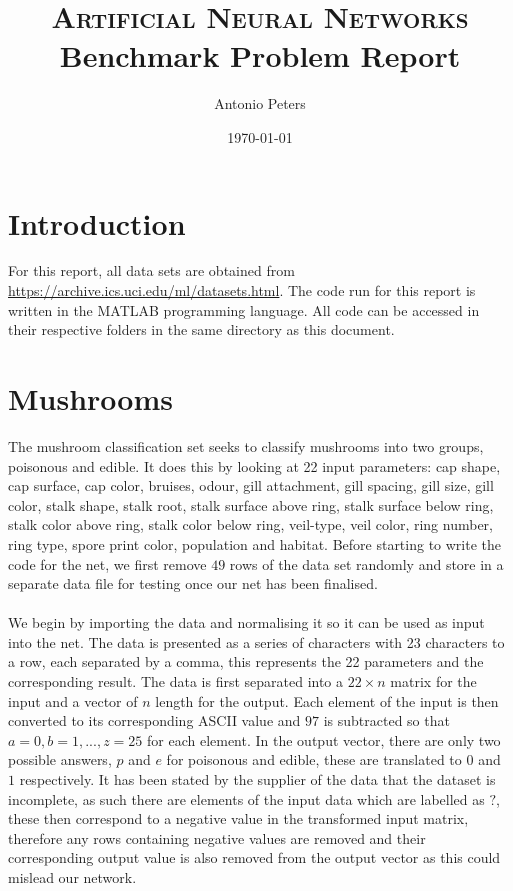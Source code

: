 \documentclass{article}%
\title{
\textsc{Artificial Neural Networks} \\ [25pt]
\huge Benchmark Problem Report \\ %
}
\author{Antonio Peters} %
\date{\today} %
\begin{document}
\maketitle %
\section{Introduction}
For this report, all data sets are obtained from \url{https://archive.ics.uci.edu/ml/datasets.html}. The code run for this report is written in the MATLAB programming language. All code can be accessed in their respective folders in the same directory as this document.
\section{Mushrooms}
The mushroom classification set seeks to classify mushrooms into two groups, poisonous and edible. It does this by looking at 22 input parameters: cap shape, cap surface, cap color, bruises, odour, gill attachment, gill spacing, gill size, gill color, stalk shape, stalk root, stalk surface above ring, stalk surface below ring, stalk color above ring, stalk color below ring, veil-type, veil color, ring number, ring type, spore print color, population and habitat. Before starting to write the code for the net, we first remove $49$ rows of the data set randomly and store in a separate data file for testing once our net has been finalised.
\\
\\
We begin by importing the data and normalising it so it can be used as input into the net. The data is presented as a series of characters with 23 characters to a row, each separated by a comma, this represents the 22 parameters and the corresponding result. The data is first separated into a $22 \times n$ matrix for the input and a vector of $n$ length for the output. Each element of the input is then converted to its corresponding ASCII value and $97$ is subtracted so that $a=0,b=1,...,z=25$ for each element. In the output vector, there are only two possible answers, $p$ and $e$ for poisonous and edible, these are translated to $0$ and $1$ respectively. It has been stated by the supplier of the data that the dataset is incomplete, as such there are elements of the input data which are labelled as $?$, these then correspond to a negative value in the transformed input matrix, therefore any rows containing negative values are removed and their corresponding output value is also removed from the output vector as this could mislead our network.
\end{document}
